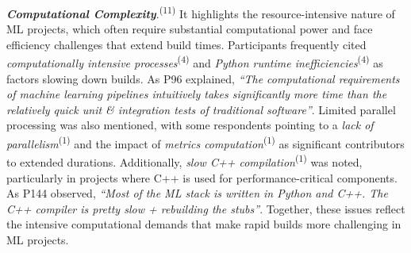 \textit{\textbf{Computational Complexity}}.\textsuperscript{(11)} It highlights the resource-intensive nature of ML projects, which often require substantial computational power and face efficiency challenges that extend build times. Participants frequently cited \textit{computationally intensive processes}\textsuperscript{(4)} and \textit{Python runtime inefficiencies}\textsuperscript{(4)} as factors slowing down builds. 
As P96 explained, \textit{``The computational requirements of machine learning pipelines intuitively takes significantly more time than the relatively quick unit \& integration tests of traditional software''}.
Limited parallel processing was also mentioned, with some respondents pointing to a \textit{lack of parallelism}\textsuperscript{(1)} and the impact of \textit{metrics computation}\textsuperscript{(1)} as significant contributors to extended durations. Additionally, \textit{slow C++ compilation}\textsuperscript{(1)} was noted, particularly in projects where C++ is used for performance-critical components. 
As P144 observed, \textit{``Most of the ML stack is written in Python and C++. The C++ compiler is pretty slow + rebuilding the stubs''}.
Together, these issues reflect the intensive computational demands that make rapid builds more challenging in ML projects. 



